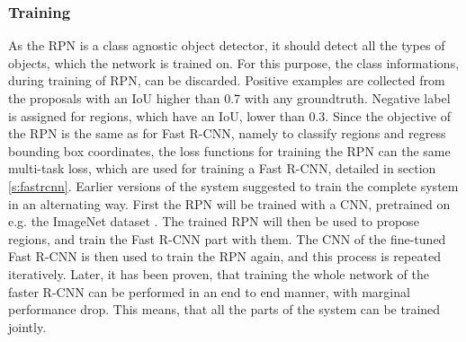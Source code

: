\subsubsection{Training}
As the RPN is a class agnostic object detector, it should detect all the types of objects, which the network is trained on. For this purpose, the class informations, during training of RPN, can be discarded. Positive examples are collected from the proposals with an IoU higher than 0.7 with any groundtruth. Negative label is assigned for regions, which have an IoU, lower than 0.3.
\bigbreak
Since the objective of the RPN is the same as for Fast R-CNN, namely to classify regions and regress bounding box coordinates, the loss functions for training the RPN can the same multi-task loss, which are used for training a Fast R-CNN, detailed in section \ref{s:fastrcnn}.
\bigbreak
Earlier versions of the system suggested to train the complete system in an alternating way. First the RPN will be trained with a CNN, pretrained on e.g. the ImageNet dataset \cite{imagenet_cvpr09}. The trained RPN will then be used to propose regions, and train the Fast R-CNN part with them. The CNN of the fine-tuned Fast R-CNN is then used to train the RPN again, and this process is repeated iteratively. Later, it has been proven, that training the whole network of the faster R-CNN can be performed in an end to end manner, with marginal performance drop. This means, that all the parts of the system can be trained jointly.
